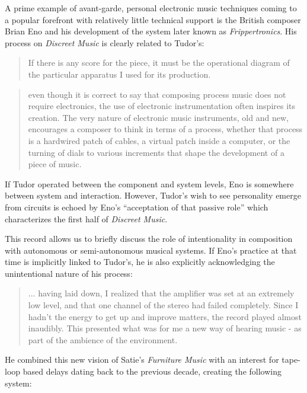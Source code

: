 \begin{itemize}
A prime example of avant-garde, personal electronic music techniques coming to a popular forefront with relatively little technical support is the British composer Brian Eno and his development of the system later known as \emph{Frippertronics}. His process on \emph{Discreet Music} is clearly related to Tudor's: 

\begin{quote}
	If there is any score for the piece, it must be the operational diagram of the particular apparatus I used for its production. \citep{eno1975}
\end{quote}



\begin{quote}

even though it is correct to say that composing process music does not require electronics, the use of electronic instrumentation often inspires its creation. The very nature of electronic music instruments, old and new, encourages a composer to think in terms of a process, whether that process is a hardwired patch of cables, a virtual patch inside a computer, or the turning of dials to various increments that shape the development of a piece of music. \cite[p.237]{holmes2002}

\end{quote}


If Tudor operated between the component and system levels, Eno is somewhere between system and interaction. However, Tudor's wish to see personality emerge from circuits is echoed by Eno's  ``acceptation of that passive role'' which characterizes the first half of \emph{Discreet Music}. 

This record allows us to briefly discuss the role of intentionality in composition with autonomous or semi-autonomous musical systems. If Eno's practice at that time is implicitly linked to Tudor's, he is also explicitly acknowledging the unintentional nature of his process: 

\begin{quote} ... having laid down, I realized that the amplifier was set at an extremely low level, and that one channel of the stereo had failed completely. Since I hadn't the energy to get up and improve matters, the record played almost inaudibly. This presented what was for me a new way of hearing music - as part of the ambience of the environment.
	
	\citep{eno1975}
	\end{quote}

He combined this new vision of Satie's \emph{Furniture Music} \citep{satie} with an interest for tape-loop based delays dating back to the previous decade, creating the following system: 


\end{itemize}
